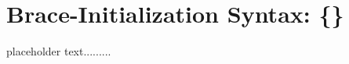 \newpage
 \section[Braced Init]{Brace-Initialization Syntax: {\SecCode \{\}}}\label{bracedinit}


placeholder text.........


